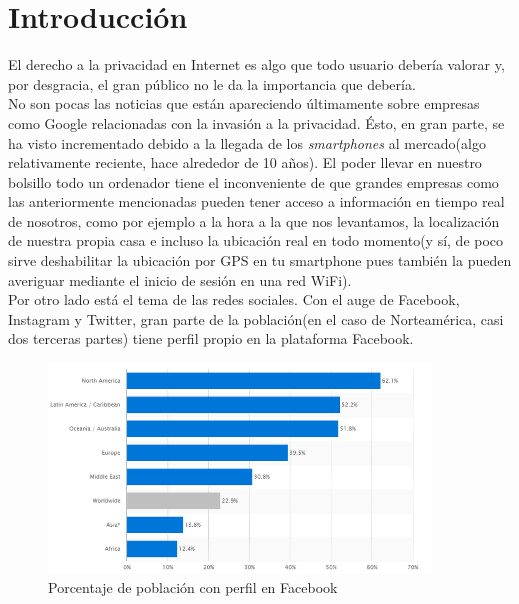 \chapter{Introducción} 
\label{chap:intro}

\vspace{-0.2cm}


El derecho a la privacidad en Internet es algo que todo usuario debería valorar y, por desgracia, el gran público no le da la importancia que debería.\\

No son pocas las noticias que están apareciendo últimamente sobre empresas como Google relacionadas con la invasión a la privacidad. Ésto, en gran parte, se ha visto incrementado debido a la llegada de los \textit{smartphones} al mercado(algo relativamente reciente, hace alrededor de 10 años). El poder llevar en nuestro bolsillo todo un ordenador tiene el inconveniente de que grandes empresas como las anteriormente mencionadas pueden tener acceso a información en tiempo real de nosotros, como por ejemplo a la hora a la que nos levantamos, la localización de nuestra propia casa e incluso la ubicación real en todo momento(y sí, de poco sirve deshabilitar la ubicación por GPS en tu smartphone pues también la pueden averiguar mediante el inicio de sesión en una red WiFi).\\
Por otro lado está el tema de las redes sociales. Con el auge de Facebook, Instagram y Twitter, gran parte de la población(en el caso de Norteamérica, casi dos terceras partes) tiene perfil propio en la plataforma Facebook.

\begin{figure}[h]
	\centerline{
		\mbox{\includegraphics[width=4.00in]{images/sn.png}}
	}
	\caption{Porcentaje de población con perfil en Facebook}
	\label{fig:norm_Daugman}
\end{figure}

